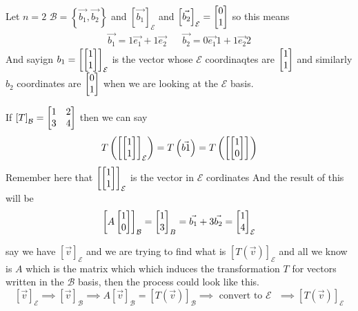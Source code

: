 \documentclass[11pt]{book}
\begin{document}
\begin{eg}
    Let $n= 2$ $\mathcal{B} = \left\{ \vec{b_1} , \vec{b_2}  \right\} $ and $\left[ \vec{b_1}  \right]_{\mathcal{E}} $ and $\left[ \vec{b_2}  \right]_{\mathcal{E}} = \begin{bmatrix} 0 \\ 1 \end{bmatrix} $ so this means
    \begin{align*}
        \vec{b_1} = 1\vec{e_1}  + 1\vec{e_2}  && \vec{b_2} = 0\vec{e_1} 1 + 1\vec{e_2} 2
    \end{align*}
    And sayign $b_1= \left[ \begin{bmatrix} 1 \\ 1 \end{bmatrix}  \right]_{\mathcal{E}} $ is the vector whose $\mathcal{E} $ coordinaqtes are $\begin{bmatrix} 1 \\ 1 \end{bmatrix} $ and similarly $b_2$ coordinates are $\begin{bmatrix} 0 \\ 1 \end{bmatrix} $ when we are looking at the $\mathcal{E} $ basis. 
\end{eg}

\begin{eg}
    If $\left[ T \right]_{\mathcal{B}} = \begin{bmatrix} 1 & 2 \\ 3 & 4 \end{bmatrix}$ then we can say 
    \begin{equation*}
        T\left(\left[ \begin{bmatrix} 1 \\ 1 \end{bmatrix}  \right]_{\mathcal{E}} \right)= T\left(\vec{b1} \right)= T\left(\left[ \begin{bmatrix} 1 \\ 0 \end{bmatrix}  \right]_{\mathcal{}} \right)
    \end{equation*}
    Remember here that $\left[ \begin{bmatrix} 1 \\ 1 \end{bmatrix}  \right]_{\mathcal{E}} $ is the vector in $\mathcal{E} $ cordinates 
    And the result of this will be 
    \[
    \left[ A \begin{bmatrix} 1 \\ 0 \end{bmatrix}  \right]_{\mathcal{B}} = \begin{bmatrix} 1 \\ 3 \end{bmatrix} _{B} = \vec{b_1}  + 3\vec{b_2} = \begin{bmatrix} 1 \\ 4 \end{bmatrix} _{\mathcal{E} } 
    \]
\end{eg}

\begin{remark}
    say we have $\left[ \vec{v}  \right]_{\mathcal{E}} $ and we are trying to find what is $\left[ T\left(\vec{v} \right) \right]_{\mathcal{E}} $ and all we know is $A$ which is the matrix which which induces the transformation $T$ for vectors written in the $\mathcal{B} $ basis, then the process could look like this.
    \[
    \left[ \vec{v}  \right]_{\mathcal{E}} \implies \left[ \vec{v}  \right]_{\mathcal{B}} \implies A\left[ \vec{v}  \right]_{\mathcal{B}} =  \left[ T\left(\vec{v} \right) \right]_{\mathcal{B}} \implies \text{ convert to $\mathcal{E} $  } \implies \left[ T\left(\vec{v} \right) \right]_{\mathcal{E}} 
    \]
\end{remark}
\end{document}
